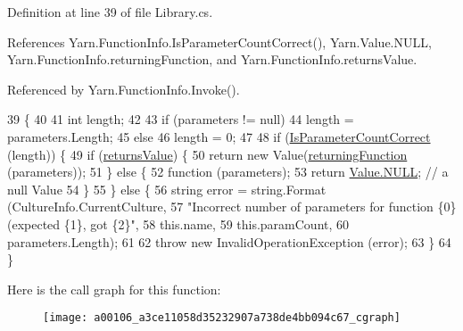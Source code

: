 Definition at line 39 of file Library.\-cs.



References Yarn.\-Function\-Info.\-Is\-Parameter\-Count\-Correct(), Yarn.\-Value.\-N\-U\-L\-L, Yarn.\-Function\-Info.\-returning\-Function, and Yarn.\-Function\-Info.\-returns\-Value.



Referenced by Yarn.\-Function\-Info.\-Invoke().


\begin{DoxyCode}
39                                                          \{
40 
41             \textcolor{keywordtype}{int} length;
42 
43             \textcolor{keywordflow}{if} (parameters != null)
44                 length = parameters.Length;
45             \textcolor{keywordflow}{else}
46                 length = 0;
47 
48             \textcolor{keywordflow}{if} (\hyperlink{a00106_a1ed09ff8aafa230a0d2bbc23cd6cd763}{IsParameterCountCorrect} (length)) \{
49                 \textcolor{keywordflow}{if} (\hyperlink{a00106_acaff044276aa230de7c0b27dd5267bc7}{returnsValue}) \{
50                     \textcolor{keywordflow}{return} \textcolor{keyword}{new} Value(\hyperlink{a00106_a8b6e0e5a875c427a1d947f3c52c308ca}{returningFunction} (parameters));
51                 \} \textcolor{keywordflow}{else} \{
52                     \textcolor{keyword}{function} (parameters);
53                     \textcolor{keywordflow}{return} \hyperlink{a00187_a1ed2964965baca8621c45efa23f37660}{Value.NULL}; \textcolor{comment}{// a null Value}
54                 \}
55             \} \textcolor{keywordflow}{else} \{
56                 \textcolor{keywordtype}{string} error = string.Format (CultureInfo.CurrentCulture,
57                     \textcolor{stringliteral}{"Incorrect number of parameters for function \{0\} (expected \{1\}, got \{2\}"},
58                     this.name,
59                     this.paramCount,
60                     parameters.Length);
61 
62                 \textcolor{keywordflow}{throw} \textcolor{keyword}{new} InvalidOperationException (error);
63             \}
64         \}
\end{DoxyCode}


Here is the call graph for this function\-:
\nopagebreak
\begin{figure}[H]
\begin{center}
\leavevmode
\texttt{[image: a00106\_a3ce11058d35232907a738de4bb094c67\_cgraph]}
\end{center}
\end{figure}




